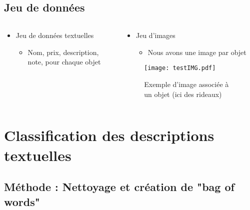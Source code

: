 \documentclass[8pt,aspectratio=169,hyperref={unicode=true}]{beamer}
\begin{document}
\subsection{Jeu de données}
\begin{frame}{\insertsubsection}
    \begin{columns}
        \begin{column}{.5\textwidth}
            \begin{itemize}
                \item Jeu de données textuelles
                      \begin{itemize}
                          \item Nom, prix, description, note, pour chaque objet
                      \end{itemize}
            \end{itemize}
            \begin{table}
            \end{table}
        \end{column}
        \begin{column}{.5\textwidth}
            \begin{itemize}
                \item Jeu d'images
                      \begin{itemize}
                          \item Nous avons une image par objet
                      \end{itemize}
            \end{itemize}
            \begin{figure}
                \texttt{[image: testIMG.pdf]}
                \caption{Exemple d'image associée à un objet (ici des rideaux)}
            \end{figure}
        \end{column}
    \end{columns}
\end{frame}

\section{Classification des descriptions textuelles}
\subsection{Méthode : Nettoyage et création de "bag of words"}
\end{document}

